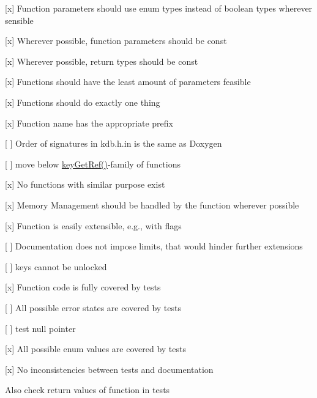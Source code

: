 \begin{DoxyItemize}
\item \mbox{[}x\mbox{]} Function parameters should use enum types instead of boolean types wherever sensible
\item \mbox{[}x\mbox{]} Wherever possible, function parameters should be {\ttfamily const}
\item \mbox{[}x\mbox{]} Wherever possible, return types should be {\ttfamily const}
\item \mbox{[}x\mbox{]} Functions should have the least amount of parameters feasible
\end{DoxyItemize}


\begin{DoxyItemize}
\item \mbox{[}x\mbox{]} Functions should do exactly one thing
\item \mbox{[}x\mbox{]} Function name has the appropriate prefix
\item \mbox{[} \mbox{]} Order of signatures in kdb.\+h.\+in is the same as Doxygen
\begin{DoxyItemize}
\item \mbox{[} \mbox{]} move below {\ttfamily \hyperlink{group__key_ga4aabc4272506dd63161db2bbb42de8ae}{key\+Get\+Ref()}}-\/family of functions
\end{DoxyItemize}
\item \mbox{[}x\mbox{]} No functions with similar purpose exist
\end{DoxyItemize}


\begin{DoxyItemize}
\item \mbox{[}x\mbox{]} Memory Management should be handled by the function wherever possible
\end{DoxyItemize}


\begin{DoxyItemize}
\item \mbox{[}x\mbox{]} Function is easily extensible, e.\+g., with flags
\item \mbox{[} \mbox{]} Documentation does not impose limits, that would hinder further extensions
\begin{DoxyItemize}
\item \mbox{[} \mbox{]} keys cannot be unlocked
\end{DoxyItemize}
\end{DoxyItemize}


\begin{DoxyItemize}
\item \mbox{[}x\mbox{]} Function code is fully covered by tests
\item \mbox{[} \mbox{]} All possible error states are covered by tests
\begin{DoxyItemize}
\item \mbox{[} \mbox{]} test null pointer
\end{DoxyItemize}
\item \mbox{[}x\mbox{]} All possible enum values are covered by tests
\item \mbox{[}x\mbox{]} No inconsistencies between tests and documentation
\end{DoxyItemize}

Also check return values of function in tests